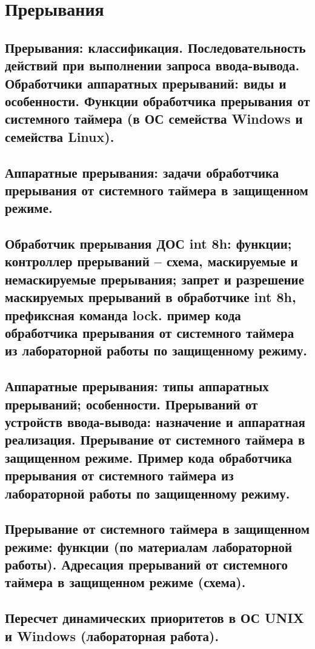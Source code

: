 \section{Прерывания}

\subsection{Прерывания: классификация. Последовательность действий при выполнении запроса ввода-вывода. Обработчики аппаратных прерываний: виды и особенности. Функции обработчика прерывания от системного таймера (в ОС семейства Windows и семейства Linux).}

\newpage

\subsection{Аппаратные прерывания: задачи обработчика прерывания от системного таймера в защищенном режиме.}

\newpage

\subsection{Обработчик прерывания ДОС int 8h: функции; контроллер прерываний – схема, маскируемые и немаскируемые прерывания; запрет и разрешение маскируемых прерываний в обработчике int 8h, префиксная команда lock. пример кода обработчика прерывания от системного таймера из лабораторной работы по защищенному режиму.}

\newpage

\subsection{Аппаратные прерывания: типы аппаратных прерываний; особенности. Прерываний от устройств ввода-вывода: назначение и аппаратная реализация. Прерывание от системного таймера в защищенном режиме. Пример кода обработчика прерывания от системного таймера из лабораторной работы по защищенному режиму.}

\newpage

\subsection{Прерывание от системного таймера в защищенном режиме: функции (по материалам лабораторной работы). Адресация прерываний от системного таймера в защищенном режиме (схема).}

\newpage

\subsection{Пересчет динамических приоритетов в ОС UNIX и Windows (лабораторная работа).}

